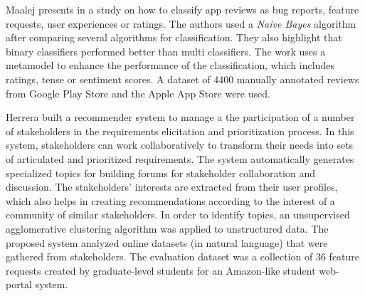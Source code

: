 Maalej \etal presents in \cite{Maalej} a study on how to classify app reviews as
bug reports, feature requests, user experiences or ratings. The authors used a
\emph{Naive Bayes} algorithm after comparing several algorithms for
classification. They also highlight that binary classifiers performed better
than multi classifiers. The work uses a metamodel to enhance the performance of
the classification, which includes ratings, tense or sentiment scores. A
dataset of 4400 manually annotated reviews from Google Play Store and the Apple
App Store were used.

Herrera \etal \cite{Castro-Herrera:2009} built a recommender system to manage a
the participation of a number of stakeholders in the requirements elicitation
and prioritization process. In this system, stakeholders can work
collaboratively to transform their needs into sets of articulated and
prioritized requirements.
The system automatically generates specialized topics for building forums for
stakeholder collaboration and discussion. The stakeholders' interests are
extracted from their user profiles, which also helps in creating
recommendations according to the interest of a community of similar
stakeholders. In order to identify topics, an unsupervised agglomerative
clustering algorithm was applied to unstructured data. The proposed system
analyzed online datasets (in natural language) that were gathered from
stakeholders. The evaluation dataset was a collection of 36 feature requests
created by graduate-level students for an Amazon-like student web-portal system.






